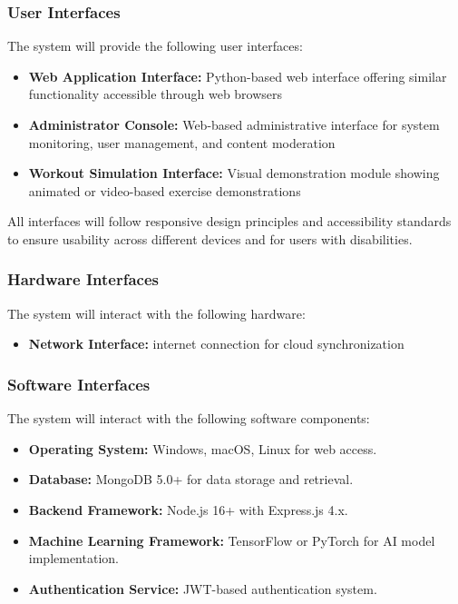\documentclass[12pt,a4paper]{article}
\begin{document}
\subsubsection{User Interfaces}
The system will provide the following user interfaces:
\begin{itemize}
    \item \textbf{Web Application Interface:} Python-based web interface offering similar functionality accessible through web browsers
    \item \textbf{Administrator Console:} Web-based administrative interface for system monitoring, user management, and content moderation
    \item \textbf{Workout Simulation Interface:} Visual demonstration module showing animated or video-based exercise demonstrations
\end{itemize}

All interfaces will follow responsive design principles and accessibility standards to ensure usability across different devices and for users with disabilities.

\subsubsection{Hardware Interfaces}
The system will interact with the following hardware:
\begin{itemize}
    \item \textbf{Network Interface:} internet connection for cloud synchronization
\end{itemize}

\subsubsection{Software Interfaces}
The system will interact with the following software components:
\begin{itemize}
    \item \textbf{Operating System:} Windows, macOS, Linux for web access.
    \item \textbf{Database:} MongoDB 5.0+ for data storage and retrieval.
    \item \textbf{Backend Framework:} Node.js 16+ with Express.js 4.x.
    \item \textbf{Machine Learning Framework:} TensorFlow or PyTorch for AI model implementation.
    \item \textbf{Authentication Service:} JWT-based authentication system.
\end{itemize}
\end{document}
